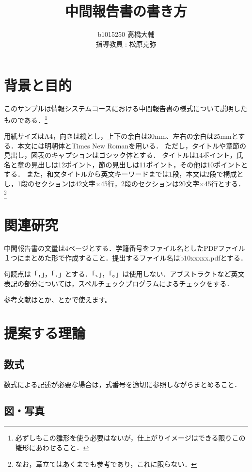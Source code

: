\documentclass[11pt,a4paper,draft]{jarticle} %
\title{中間報告書の書き方}
\author{b1015250 高橋大輔\\指導教員 : 松原克弥}
\begin{document}
\maketitle

\section{背景と目的}

このサンプルは情報システムコースにおける中間報告書の様式について説明したものである．\footnote{必ずしもこの雛形を使う必要はないが，仕上がりイメージはできる限りこの雛形にあわせること．}

用紙サイズはA4，向きは縦とし，上下の余白は30mm、左右の余白は25mmとする．本文には明朝体とTimes New Romanを用いる．
ただし，タイトルや章節の見出し，図表のキャプションはゴシック体とする．
タイトルは14ポイント，氏名と章の見出しは12ポイント，節の見出しは11ポイント，その他は10ポイントとする．
また，和文タイトルから英文キーワードまでは1段，本文は2段で構成とし，1段のセクションは42文字×45行，2段のセクションは20文字×45行とする．
\footnote{なお，章立てはあくまでも参考であり，これに限らない．}

\section{関連研究}

中間報告書の文量は4ページとする．学籍番号をファイル名としたPDFファイル１つにまとめた形で作成すること．提出するファイル名はb10xxxxx.pdfとする．

句読点は「，」，「．」とする．「、」，「。」は使用しない．アブストラクトなど英文表記の部分については，スペルチェックプログラムによるチェックをする．

参考文献は\cite{netflix-2016}とか、\cite{lewis-2014}とかで使えます。

\section{提案する理論}

\subsection{数式}

数式による記述が必要な場合は，式番号を適切に参照しながらまとめること．

\subsection{図・写真}
\end{document}
